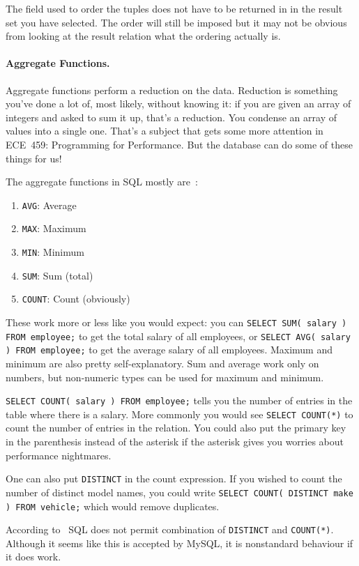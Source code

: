 The field used to order the tuples does not have to be returned in in the result set you have selected. The order will still be imposed but it may not be obvious from looking at the result relation what the ordering actually is.

\paragraph{Aggregate Functions.} Aggregate functions perform a reduction on the data. Reduction is something you've done a lot of, most likely, without knowing it: if you are given an array of integers and asked to sum it up, that's a reduction. You condense an array of values into a single one. That's a subject that gets some more attention in ECE~459: Programming for Performance. But the database can do some of these things for us!

The aggregate functions in SQL mostly are~\cite{dsc}:
\begin{enumerate}
	\item \texttt{AVG}: Average 
	\item \texttt{MAX}: Maximum
	\item \texttt{MIN}: Minimum
	\item \texttt{SUM}: Sum (total)
	\item \texttt{COUNT}: Count (obviously)
\end{enumerate}

These work more or less like you would expect: you can \texttt{SELECT SUM( salary ) FROM employee;} to get the total salary of all employees, or \texttt{SELECT AVG( salary ) FROM employee;} to get the average salary of all employees. Maximum and minimum are also pretty self-explanatory. Sum and average work only on numbers, but non-numeric types can be used for maximum and minimum. 

\texttt{SELECT COUNT( salary ) FROM employee;} tells you the number of entries in the table where there is a salary. More commonly you would see \texttt{SELECT COUNT(*)} to count the number of entries in the relation. You could also put the primary key in the parenthesis instead of the asterisk if the asterisk gives you worries about performance nightmares.

One can also put \texttt{DISTINCT} in the count expression. If you wished to count the number of distinct model names, you could write \texttt{SELECT COUNT( DISTINCT make ) FROM vehicle;} which would remove duplicates.

According to~\cite{dsc} SQL does not permit combination of \texttt{DISTINCT} and \texttt{COUNT(*)}. Although it seems like this is accepted by MySQL, it is nonstandard behaviour if it does work. 

